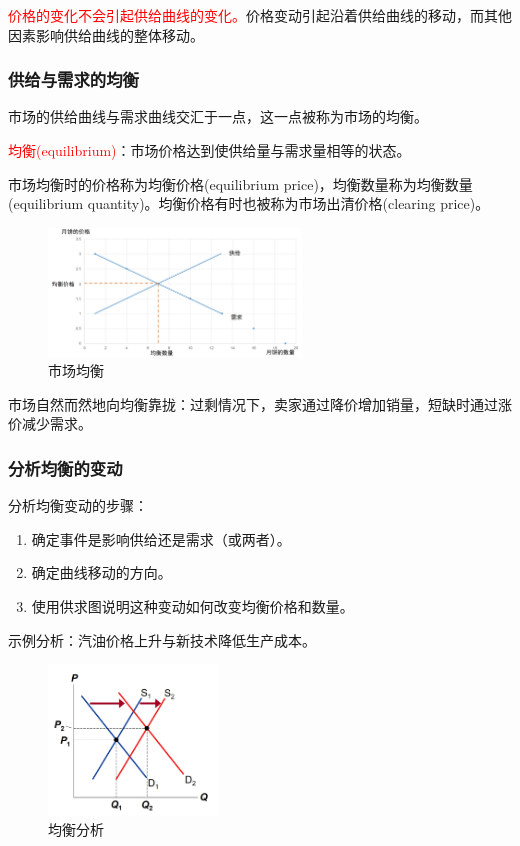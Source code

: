 \documentclass[12pt, a4paper]{article}
\begin{document}
\textcolor{red}{价格的变化不会引起供给曲线的变化。}价格变动引起沿着供给曲线的移动，而其他因素影响供给曲线的整体移动。

\subsubsection{供给与需求的均衡}
市场的供给曲线与需求曲线交汇于一点，这一点被称为市场的均衡。

\textcolor{red}{均衡(equilibrium)}：市场价格达到使供给量与需求量相等的状态。

\noindent 市场均衡时的价格称为均衡价格(equilibrium price)，均衡数量称为均衡数量(equilibrium quantity)。均衡价格有时也被称为市场出清价格(clearing price)。

\begin{figure}[H]
  \centering
  \includegraphics[width=0.6\textwidth]{均衡.png}
  \caption{市场均衡}
\end{figure}

市场自然而然地向均衡靠拢：过剩情况下，卖家通过降价增加销量，短缺时通过涨价减少需求。

\subsubsection{分析均衡的变动}
分析均衡变动的步骤：
\begin{enumerate}
    \item 确定事件是影响供给还是需求（或两者）。
    \item 确定曲线移动的方向。
    \item 使用供求图说明这种变动如何改变均衡价格和数量。
\end{enumerate}

示例分析：汽油价格上升与新技术降低生产成本。

\begin{figure}[H]
  \centering
  \includegraphics[width=0.4\textwidth]{均衡分析.png}
  \caption{均衡分析}
\end{figure}
\end{document}
